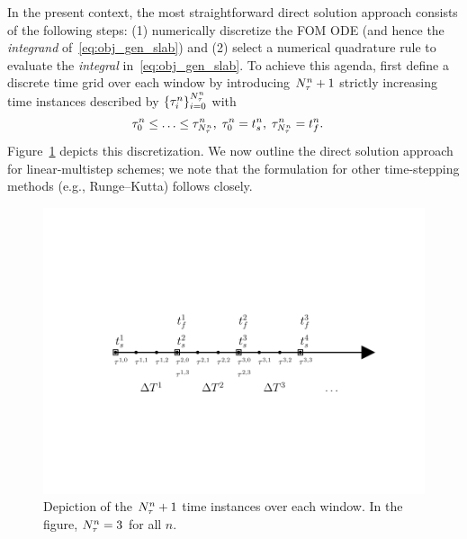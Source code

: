 In the present context, the most straightforward direct solution approach consists of the 
following steps: (1) numerically discretize the FOM ODE (and hence the \textit{integrand} of~\eqref{eq:obj_gen_slab}) and 
(2) select a numerical quadrature rule to evaluate the \textit{integral} in~\eqref{eq:obj_gen_slab}.
To achieve this agenda, first define a discrete time grid 
over each window by introducing
$N_{\tau}^{n}+1$ strictly increasing time instances described by
$\{\tau^{n}_{i}\}_{i=0}^{N_{\tau}^{n}}$ with
\begin{align}
&\tau^{n}_{0} \le \ldots \le \tau^{n}_{N_{\tau}^{n}} , \label{eq:timegrid1} \;
\tau^{n}_{0} = t_s^{n},\;
\tau^{n}_{N_{\tau}^{n}} = t_f^{n} . 
\end{align}
Figure~\ref{fig:slab_fig2} depicts this discretization.
We now outline the direct solution approach for linear-multistep schemes; we note that the formulation for
other time-stepping methods (e.g., Runge--Kutta) follows closely. 
\begin{figure} 
\begin{centering} 
\includegraphics[trim={0.0cm 5cm 0cm 3cm},clip,width=1.0\textwidth]{figs/time_grid_timesteps.pdf} 
	\caption{Depiction of the $N_{\tau}^{n}+1$ time instances over each window. In the figure, $N_{\tau}^{n} = 3$ for all $n$.} 
\label{fig:slab_fig2} 
\end{centering} 
\end{figure}

